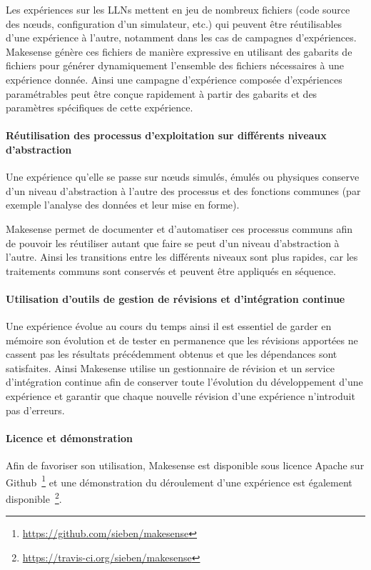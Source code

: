 Les expériences sur les \ac{LLN}s mettent en jeu de nombreux fichiers (code source des nœuds, configuration d'un simulateur, etc.) qui peuvent être réutilisables d'une expérience à l'autre, notamment dans les cas de campagnes d'expériences.
Makesense génère ces fichiers de manière expressive en utilisant des gabarits de fichiers pour générer dynamiquement l'ensemble des fichiers nécessaires à une expérience donnée.
Ainsi une campagne d'expérience composée d'expériences paramétrables peut être conçue rapidement à partir des gabarits et des paramètres spécifiques de cette expérience.

\paragraph{Réutilisation des processus d'exploitation sur différents niveaux d'abstraction}

Une expérience qu'elle se passe sur nœuds simulés, émulés ou physiques conserve d'un niveau d'abstraction à l'autre des processus et des fonctions communes (par exemple l'analyse des données et leur mise en forme).

Makesense permet de documenter et d'automatiser ces processus communs afin de pouvoir les réutiliser autant que faire se peut d'un niveau d'abstraction à l'autre.
Ainsi les transitions entre les différents niveaux sont plus rapides, car les traitements communs sont conservés et peuvent être appliqués en séquence.

\paragraph{Utilisation d'outils de gestion de révisions et d'intégration continue}

Une expérience évolue au cours du temps ainsi il est essentiel de garder en mémoire son évolution et de tester en permanence que les révisions apportées ne cassent pas les résultats précédemment obtenus et que les dépendances sont satisfaites.
Ainsi Makesense utilise un gestionnaire de révision et un service d'intégration continue afin de conserver toute l'évolution du développement d'une expérience et garantir que chaque nouvelle révision d'une expérience n'introduit pas d'erreurs.

\paragraph{Licence et démonstration}

Afin de favoriser son utilisation, Makesense est disponible sous licence Apache sur Github~\footnote{\href{https://github.com/sieben/makesense}{https://github.com/sieben/makesense}} et une démonstration du déroulement d'une expérience est également disponible~\footnote{\href{https://travis-ci.org/sieben/makesense}{https://travis-ci.org/sieben/makesense}}.

